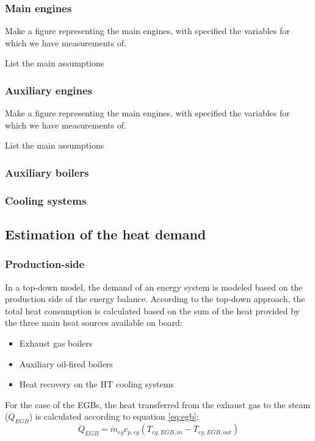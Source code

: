 \documentclass[preprint,12pt]{elsarticle}
\begin{document}
\subsubsection*{Main engines}

Make a figure representing the main engines, with specified the variables for which we have measurements of. 

List the main assumptions

\subsubsection*{Auxiliary engines}

Make a figure representing the main engines, with specified the variables for which we have measurements of. 

List the main assumptions

\subsubsection*{Auxiliary boilers}

\subsubsection*{Cooling systems}

\subsection{Estimation of the heat demand} \label{sec:met:heat}

\subsubsection*{Production-side}

In a top-down model, the demand of an energy system is modeled based on the production side of the energy balance. According to the top-down approach, the total heat consumption is calculated based on the sum of the heat provided by the three main heat sources available on board:
\begin{itemize}
	\item Exhaust gas boilers
	\item Auxiliary oil-fired boilers
	\item Heat recovery on the HT cooling systems
\end{itemize}

For the case of the EGBs, the heat transferred from the exhaust gas to the steam ($\dot{Q}_{EGB}$) is calculated according to equation \ref{eq:egb}:
\begin{equation}
\dot{Q}_{EGB} = \dot{m}_{eg} c_{p,eg} (T_{eg,EGB,in} - T_{eg,EGB,out})
\end{equation}\label{eq:egb}
\end{document}
